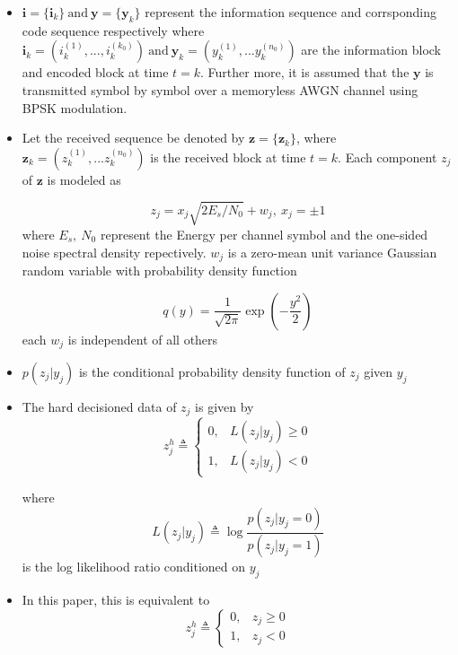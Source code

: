 \documentclass[fontsize=12pt]{article}
\theoremstyle{definition}
\begin{document}
\begin{enumerate}
\begin{itemize}
\item $\mathbf{i}=\{ \mathbf{i}_k\}~\text{and}~ \mathbf{y}=\{ \mathbf{y}_k\}$ represent the information sequence and corrsponding code sequence respectively where $ \mathbf{i}_k=(i_k^{(1)},...,i_k^{(k_0)}) ~\text{and}~ \mathbf{y}_k=(y_k^{(1)},...y_k^{(n_0)})$ are the information block and encoded block at time $t=k$. Further more, it is assumed that the $\mathbf{y}$ is transmitted symbol by symbol over a memoryless AWGN channel using BPSK modulation.

\item Let the received sequence be denoted by $\mathbf{z}=\{ \mathbf{z}_k\}$, where $\mathbf{z}_k=(z_k^{(1)},...z_k^{(n_0)})$ is the received block at time $t=k$. Each component $z_j$ of $\mathbf{z}$ is modeled as 

\begin{equation}
z_j = x_j\sqrt{2E_s/N_0} +w_j,~x_j=\pm1
\end{equation}
where $E_s,~N_0$ represent the Energy per channel symbol and the one-sided noise spectral density repectively. $w_j$ is a zero-mean unit variance Gaussian random variable with probability density function 

\begin{equation}
q(y) =\frac{1}{\sqrt{2\pi}}\exp{(-\frac{y^2}{2})}
\end{equation}
each $w_j$ is independent of all others

\item $p(z_j|y_j)$ is the conditional probability density function of $z_j$ given $y_j$ 

\item The hard decisioned data of $z_j$ is given by
\begin{equation}
    z_j^h \triangleq
    \begin{cases}
      0, & L(z_j|y_j) \geq 0 \\
      1, & L(z_j|y_j) <0
    \end{cases}
  \end{equation}

where
 \begin{equation}
 L(z_j|y_j) \triangleq \log \frac{p(z_j|y_j=0)}{p(z_j|y_j=1)}
\end{equation}
 is the log likelihood ratio conditioned on $y_j$

\item In this paper, this is equivalent to 
\begin{equation}
    z_j^h \triangleq
    \begin{cases}
      0, & z_j \geq 0 \\
      1, & z_j <0
    \end{cases}
  \end{equation}


\end{itemize}
\end{enumerate}
\end{document}

